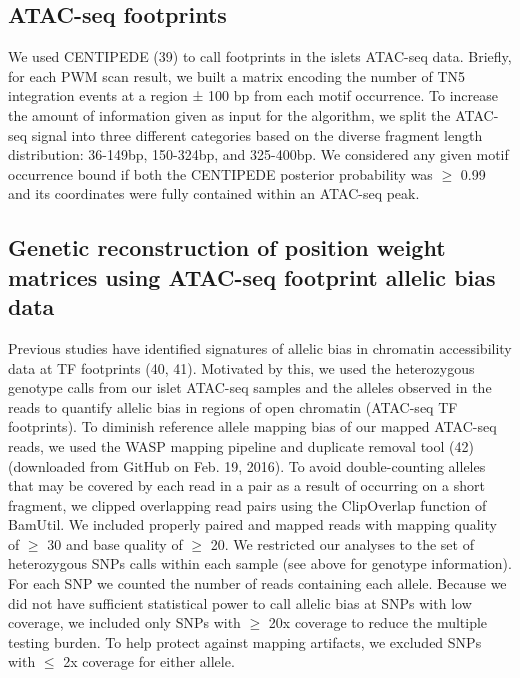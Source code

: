 \subsection{ATAC-seq footprints}
We used CENTIPEDE (39) to call footprints in the islets ATAC-seq data. Briefly, for each PWM scan result, we built a matrix encoding the number of TN5 integration events at a region ± 100 bp from each motif occurrence. To increase the amount of information given as input for the algorithm, we split the ATAC-seq signal into three different categories based on the diverse fragment length distribution: 36-149bp, 150-324bp, and 325-400bp. We considered any given motif occurrence bound if both the CENTIPEDE posterior probability was $\geq$ 0.99 and its coordinates were fully contained within an ATAC-seq peak. 

\subsection{Genetic reconstruction of position weight matrices using ATAC-seq footprint allelic bias data}
Previous studies have identified signatures of allelic bias in chromatin accessibility data at TF footprints (40, 41). Motivated by this, we used the heterozygous genotype calls from our islet ATAC-seq samples and the alleles observed in the reads to quantify allelic bias in regions of open chromatin (ATAC-seq TF footprints). To diminish reference allele mapping bias of our mapped ATAC-seq reads, we used the WASP mapping pipeline and duplicate removal tool (42) (downloaded from GitHub on Feb. 19, 2016). To avoid double-counting alleles that may be covered by each read in a pair as a result of occurring on a short fragment, we clipped overlapping read pairs using the ClipOverlap function of BamUtil. We included properly paired and mapped reads with mapping quality of $\geq$ 30 and base quality of $\geq$ 20. We restricted our analyses to the set of heterozygous SNPs calls within each sample (see above for genotype information). For each SNP we counted the number of reads containing each allele.  Because we did not have sufficient statistical power to call allelic bias at SNPs with low coverage, we included only SNPs with $\geq$ 20x coverage to reduce the multiple testing burden.  To help protect against mapping artifacts, we excluded SNPs with $\leq$ 2x coverage for either allele. 

